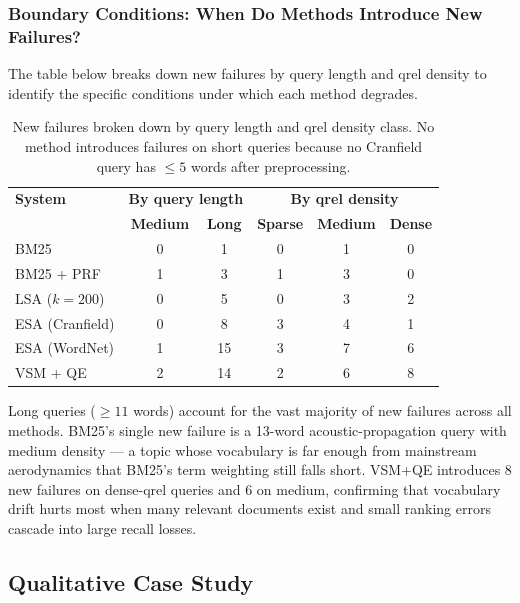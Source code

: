 \documentclass{svproc}
\begin{document}
    \subsubsection*{Boundary Conditions: When Do Methods Introduce New Failures?}

    The table below breaks down new failures by query length and qrel density to identify the specific conditions under which each method degrades.

    \begin{table}[H]
    \centering
    \renewcommand{\arraystretch}{1.2}
    \begin{tabular}{lcc|ccc}
    \toprule
    \textbf{System} & \multicolumn{2}{c|}{\textbf{By query length}} & \multicolumn{3}{c}{\textbf{By qrel density}} \\
    & \textbf{Medium} & \textbf{Long} & \textbf{Sparse} & \textbf{Medium} & \textbf{Dense} \\
    \midrule
    BM25               & 0 & 1 & 0 & 1 & 0 \\
    BM25 + PRF         & 1 & 3 & 1 & 3 & 0 \\
    LSA ($k{=}200$)    & 0 & 5 & 0 & 3 & 2 \\
    ESA (Cranfield)    & 0 & 8 & 3 & 4 & 1 \\
    ESA (WordNet)      & 1 & 15 & 3 & 7 & 6 \\
    VSM + QE           & 2 & 14 & 2 & 6 & 8 \\
    \bottomrule
    \end{tabular}
    \caption{New failures broken down by query length and qrel density class. No method introduces failures on short queries because no Cranfield query has $\le 5$ words after preprocessing.}
    \label{tab:boundary}
    \end{table}

    Long queries ($\ge 11$ words) account for the vast majority of new failures across all methods. BM25's single new failure is a 13-word acoustic-propagation query with medium density — a topic whose vocabulary is far enough from mainstream aerodynamics that BM25's term weighting still falls short. VSM+QE introduces 8 new failures on dense-qrel queries and 6 on medium, confirming that vocabulary drift hurts most when many relevant documents exist and small ranking errors cascade into large recall losses.

    \subsection{Qualitative Case Study}
\end{document}
